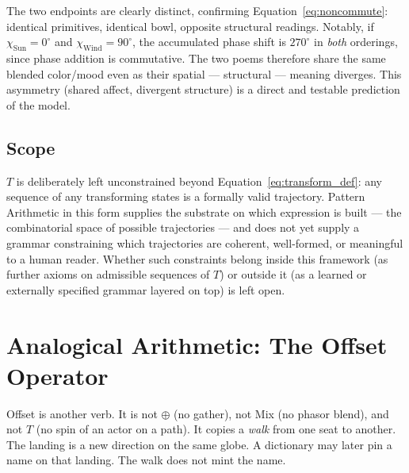 \documentclass[12pt, a4paper]{article}
\begin{document}
The two endpoints are clearly distinct, confirming
Equation~\eqref{eq:noncommute}: identical primitives, identical
bowl, opposite structural readings. Notably, if $\chi_{\text{Sun}}
= 0^\circ$ and $\chi_{\text{Wind}} = 90^\circ$, the accumulated phase
shift is $270^\circ$ in \emph{both} orderings, since phase addition is
commutative. The two poems therefore share the same blended color/mood
even as their spatial --- structural --- meaning diverges. This
asymmetry (shared affect, divergent structure) is a direct and
testable prediction of the model.

\subsection{Scope}
\label{subsec:transform_scope}
$T$ is deliberately left unconstrained beyond
Equation~\eqref{eq:transform_def}: any sequence of any transforming
states is a formally valid trajectory. Pattern Arithmetic in this form
supplies the substrate on which expression is built --- the
combinatorial space of possible trajectories --- and does not yet
supply a grammar constraining which trajectories are coherent,
well-formed, or meaningful to a human reader. Whether such constraints
belong inside this framework (as further axioms on admissible
sequences of $T$) or outside it (as a learned or externally specified
grammar layered on top) is left open.

\section{Analogical Arithmetic: The Offset Operator}
\label{sec:analogical_offset}

Offset is another verb. It is not $\oplus$ (no gather), not Mix
(no phasor blend), and not $T$
(no spin of an actor on a path). It copies a \emph{walk} from one
seat to another. The landing is a new direction on the same globe.
A dictionary may later pin a name on that landing. The walk does
not mint the name.
\end{document}
